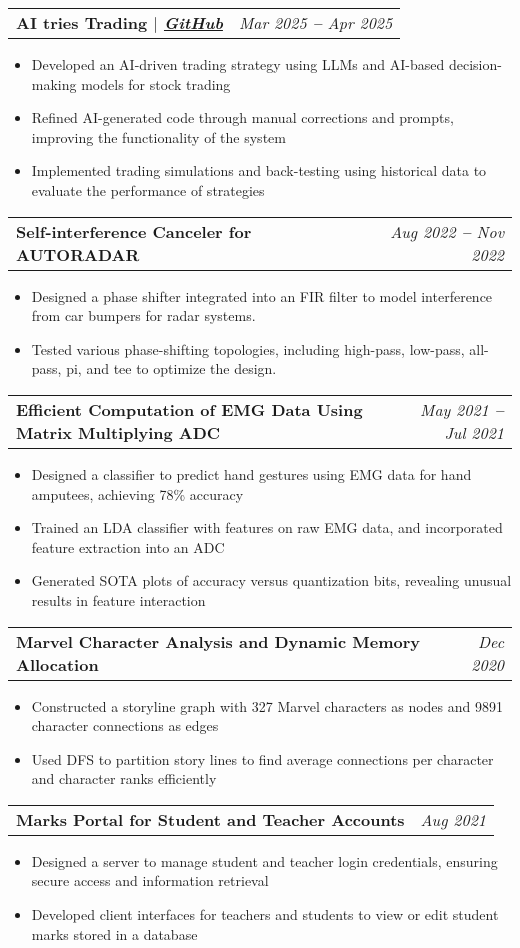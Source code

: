 \documentclass[letterpaper,11pt]{article}
\makeatletter
\newcommand{\resumeItem}[1]{
  \item\small{
    {#1 \vspace{-2pt}}
  }
}
\newcommand{\resumeProjectHeading}[2]{
    \vspace{-2pt}\item
    \begin{tabular*}{0.97\textwidth}[t]{l@{\extracolsep{\fill}}r}
      \textbf{#1} & \textit{\small #2} \\
    \end{tabular*}\vspace{-7pt}
}
\newcommand{\resumeItemListStart}{\begin{itemize}}
\newcommand{\resumeItemListEnd}{\end{itemize}\vspace{-5pt}}
\makeatother
\begin{document}
      \resumeProjectHeading
        {\textbf{AI tries Trading} $|$ \emph{\href{https://github.com/sivatanujgunta/AItriesTrading}{\color{blue}GitHub}}}{Mar 2025 \textbf{--} Apr 2025}
          \resumeItemListStart
            \resumeItem{Developed an AI-driven trading strategy using LLMs and AI-based decision-making models for stock trading}
            \resumeItem{Refined AI-generated code through manual corrections and prompts, improving the functionality of the system}
            \resumeItem{Implemented trading simulations and back-testing using historical data to evaluate the performance of strategies}
          \resumeItemListEnd

      \resumeProjectHeading
        {\textbf{Self-interference Canceler for AUTORADAR}}{Aug 2022 \textbf{--} Nov 2022}
          \resumeItemListStart
            \resumeItem{Designed a phase shifter integrated into an FIR filter to model interference from car bumpers for radar systems.}
            \resumeItem{Tested various phase-shifting topologies, including high-pass, low-pass, all-pass, pi, and tee to optimize the design.}
          \resumeItemListEnd

      \resumeProjectHeading
        {\textbf{Efficient Computation of EMG Data Using Matrix Multiplying ADC}}{May 2021 \textbf{--} Jul 2021}
          \resumeItemListStart
            \resumeItem{Designed a classifier to predict hand gestures using EMG data for hand amputees, achieving 78\% accuracy}
            \resumeItem{Trained an LDA classifier with features on raw EMG data, and incorporated feature extraction into an ADC}
            \resumeItem{Generated SOTA plots of accuracy versus quantization bits, revealing unusual results in feature interaction}
          \resumeItemListEnd
\vspace{10pt}
      \resumeProjectHeading
        {\textbf{Marvel Character Analysis and Dynamic Memory Allocation}}{Dec 2020}
          \resumeItemListStart
            \resumeItem{Constructed a storyline graph with 327 Marvel characters as nodes and 9891 character connections as edges}
            \resumeItem{Used DFS to partition story lines to find average connections per character and character ranks efficiently}
          \resumeItemListEnd

      \resumeProjectHeading
        {\textbf{Marks Portal for Student and Teacher Accounts}}{Aug 2021}
          \resumeItemListStart
            \resumeItem{Designed a server to manage student and teacher login credentials, ensuring secure access and information retrieval}
            \resumeItem{Developed client interfaces for teachers and students to view or edit student marks stored in a database}
          \resumeItemListEnd
\end{document}
